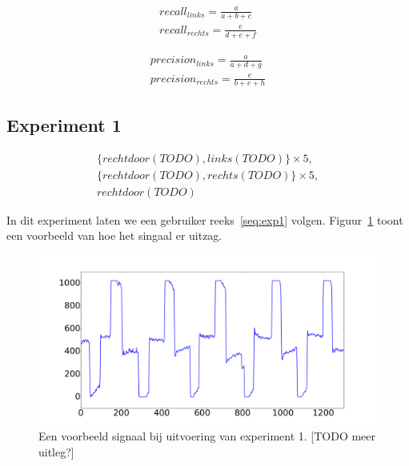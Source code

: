 \documentclass{article}
\begin{document}
\begin{equation}
\begin{aligned}
\label{eq:recall}
recall_{links} = \frac{a}{a + b + c} \\
recall_{rechts} = \frac{e}{d + e + f}
\end{aligned}
\end{equation}

\begin{equation}
\begin{aligned}
\label{eq:precision}
precision_{links} = \frac{a}{a + d + g} \\
precision_{rechts} = \frac{e}{b + e + h}
\end{aligned}
\end{equation}

\subsection{Experiment 1}

\begin{equation}
\begin{aligned}
\label{seq:exp1}
& \{rechtdoor(TODO), links(TODO)\} \times 5,& \\
& \{rechtdoor(TODO), rechts(TODO)\} \times 5,& \\
& rechtdoor(TODO) &
\end{aligned}
\end{equation}

In dit experiment laten we een gebruiker reeks~\ref{seq:exp1} volgen. Figuur~\ref{fig:experiment1} toont een voorbeeld van hoe het singaal er uitzag.  

\begin{figure}[h]
\centering
\includegraphics[width=\linewidth]{images/experiment1}
\caption{Een voorbeeld signaal bij uitvoering van experiment 1. [TODO meer uitleg?]}
\label{fig:experiment1}
\end{figure}
\end{document}
